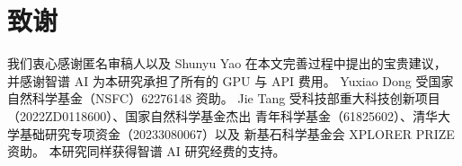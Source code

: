 
\section*{致\quad 谢}

我们衷心感谢匿名审稿人以及 Shunyu Yao 在本文完善过程中提出的宝贵建议，
并感谢智谱 AI 为本研究承担了所有的 GPU 与 API 费用。
Yuxiao Dong 受国家自然科学基金（NSFC）62276148 资助。
Jie Tang 受科技部重大科技创新项目（2022ZD0118600）、国家自然科学基金杰出
青年科学基金（61825602）、清华大学基础研究专项资金（20233080067）以及
新基石科学基金会 XPLORER PRIZE 资助。
本研究同样获得智谱 AI 研究经费的支持。
